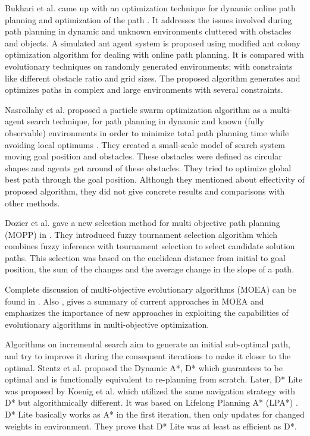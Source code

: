 Bukhari et al. came up with an optimization technique for dynamic online path planning and optimization of the path \cite{Bukhari:2010}. It addresses the issues involved during path planning in dynamic and unknown environments cluttered with obstacles and objects. A simulated ant agent system is proposed using modified ant colony optimization algorithm for dealing with online path planning. It is compared with evolutionary techniques on randomly generated environments; with constraints like different obstacle ratio and grid sizes. The proposed algorithm generates and optimizes paths in complex and large environments with several constraints.

Nasrollahy et al. proposed a particle swarm optimization algorithm as a multi-agent search technique, for path planning in dynamic and known (fully observable) environments in order to minimize total path planning time while avoiding local optimums \cite{Nasrollahy:2009}. They created a small-scale model of search system moving goal position and obstacles. These obstacles were defined as circular shapes and agents get around of these obstacles. They tried to optimize global best path through the goal position. Although they mentioned about effectivity of proposed algorithm, they did not give concrete results and comparisons with other methods.

Dozier et al. gave a new selection method for multi objective path planning (MOPP) in \cite{Dozier:1998}. They introduced fuzzy tournament selection algorithm which combines fuzzy inference with tournament selection to select candidate solution paths. This selection was based on the euclidean distance from initial to goal position, the sum of the changes and the average change in the slope of a path.

Complete discussion of multi-objective evolutionary algorithms (MOEA) can be found in \cite{MOOUEA}. Also \cite{Coello:2000}, gives a summary of current approaches in MOEA and emphasizes the importance of new approaches in exploiting the capabilities of evolutionary algorithms in multi-objective optimization.

Algorithms on incremental search aim to generate an initial sub-optimal path, and try to improve it during the consequent iterations to make it closer to the optimal. Stentz et al. proposed the Dynamic A*, D* \cite{DStar:1994} which guarantees to be optimal and is functionally equivalent to re-planning from scratch. Later, D* Lite was proposed by Koenig et al. \cite{Koenig:2002} which utilized the same navigation strategy with D* but algorithmically different. It was based on Lifelong Planning A* (LPA*) \cite{LPAStarKoenig:2004}. D* Lite basically works as A* in the first iteration, then only updates for changed weights in environment. They prove that D* Lite was at least as efficient as D*.

